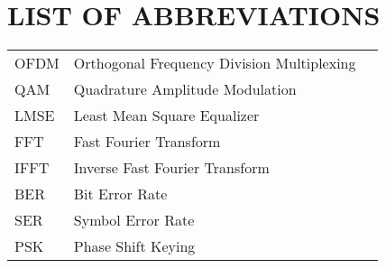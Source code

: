 \section*{LIST OF ABBREVIATIONS}
 {}

\begin{tabularx}{\textwidth}{ L{0.4} L{1.3} L{1.3} }
    OFDM & Orthogonal Frequency Division Multiplexing \\
    QAM & Quadrature Amplitude Modulation \\
    LMSE & Least Mean Square Equalizer \\ %
    FFT & Fast Fourier Transform \\
    IFFT & Inverse Fast Fourier Transform \\
    BER & Bit Error Rate \\
    SER & Symbol Error Rate \\
    PSK & Phase Shift Keying \\
\end{tabularx}

\newpage